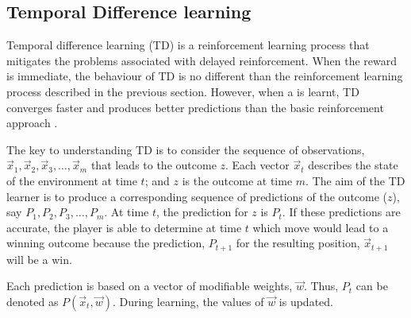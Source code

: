 \subsection{Temporal Difference learning}
Temporal difference learning (TD) is a reinforcement learning process that mitigates the problems associated with delayed reinforcement.  When the reward is immediate, the behaviour of TD is no different than the reinforcement learning process described in the previous section.  However, when a  is learnt, TD converges faster and produces better predictions than the basic reinforcement approach \cite{sutton:temporal}.  

The key to understanding TD is to consider the sequence of observations, $\vec{x}_1, \vec{x}_2, \vec{x}_3, \ldots, \vec{x}_m$ that leads to the outcome $z$.  Each vector $\vec{x}_t$ describes the state of the environment at time $t$; and $z$ is the outcome at time $m$. The aim of the TD learner is to produce a corresponding sequence of predictions of the outcome ($z$), say $P_1,P_2, P_3, \ldots, P_m$.  At time $t$, the prediction for $z$ is $P_t$.  If these predictions are accurate, the player is able to determine at time $t$ which move would lead to a winning outcome because the prediction, $P_{t+1}$ for the resulting position, $\vec{x}_{t+1}$  will be a win.

Each prediction is based on a vector of modifiable weights, $\vec{w}$. Thus, $P_t$ can be denoted as $P(\vec{x}_t,\vec{w})$.  During learning, the values of $\vec{w}$ is updated.  

